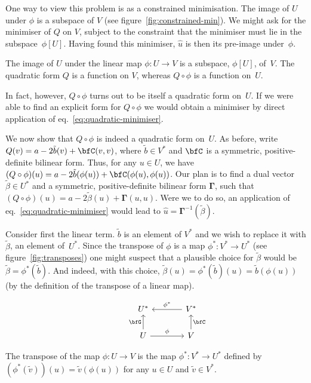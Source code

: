 \documentclass[10pt, a4paper]{article}
\begin{document}
One way to view this problem is as a constrained minimisation. The
image of $U$ under $\phi$ is a subspace of $V$ (see
figure~\ref{fig:constrained-min}). We might ask for the minimiser of
$Q$ on $V$, subject to the constraint that the minimiser must lie in
the subspace~$\phi[U]$. Having found this minimiser, $\hat{u}$ is then
its pre-image under~$\phi$.
\begin{marginfigure}
  \begin{center}
  \end{center}
  \caption{The image of $U$ under the linear map $\phi:U\to V$ is a
    subspace, $\phi[U]$, of~$V$. The quadratic form $Q$ is a function on
    $V$, whereas $Q\circ\phi$ is a function
    on~$U$.\label{fig:constrained-min}}
\end{marginfigure}

In fact, however, $Q\circ\phi$ turns out to be itself a quadratic form
on~$U$. If we were able to find an explicit form for $Q\circ\phi$ we would
obtain a minimiser by direct application of
eq.~\eqref{eq:quadratic-minimiser}.

We now show that $Q\circ\phi$ is indeed a quadratic form on~$U$. As before,
write $Q(v)=a -2\tilde{b}(v) + \bfC(v,v)$, where $\tilde{b}\in V^*$ and
$\bfC$ is a symmetric, positive-definite bilinear form. Thus, for any
$u\in U$, we have
$(Q\circ\phi)(u) = a -2\tilde{b}(\phi(u)) + \bfC(\phi(u), \phi(u))$. Our plan is to
find a dual vector $\tilde{\beta}\in U^*$ and a symmetric, positive-definite
bilinear form $\bm{\Gamma}$, such that
$(Q\circ\phi)(u)=a -2\tilde{\beta}(u) + \bm{\Gamma}(u,u)$. Were we to do so, an
application of eq.~\eqref{eq:quadratic-minimiser} would lead to
$\hat{u}=\bm{\Gamma}^{-1}(\tilde{\beta})$.

Consider first the linear term. $\tilde{b}$ is an element of $V^*$ and
we wish to replace it with $\tilde{\beta}$, an element of~$U^*$. Since the
transpose of $\phi$ is a map $\phi^*\colon V^*\to U^*$ (see
figure~\ref{fig:transposes}) one might suspect that a plausible choice
for $\tilde{\beta}$ would be $\tilde{\beta}=\phi^*(\tilde{b})$. And indeed, with
this choice,
$\tilde{\beta}(u) = \phi^*(\tilde{b})(u)= \tilde{b}(\phi(u))$ (by the
definition of the transpose of a linear map).
\begin{marginfigure}
  \[\begin{tikzcd}[column sep=large]
      & U^*  & V^* \arrow[l, "\phi^*"'] \\
      & U \arrow[u, "\bfG"] \arrow[r, "\phi"] & V \arrow[u,
      "\bfC"'] 
    \end{tikzcd}\]
  \caption{The transpose of the map $\phi\colon U\to V$ is the map
    $\phi^*\colon V^*\to U^*$ defined by
    $(\phi^*(\tilde{v}))(u) = \tilde{v}(\phi(u))$ for any $u\in U$ and
    $\tilde{v}\in V^*$. \label{fig:transposes}}
\end{marginfigure} 
\end{document}
